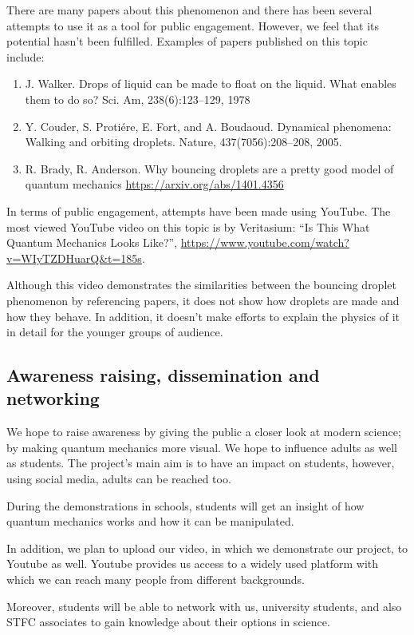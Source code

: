 There are many papers about this phenomenon and there has been several attempts to use it as a tool for public engagement. However, we feel that its potential hasn't been fulfilled. Examples of papers published on this topic include:
\begin{enumerate}
    \item J. Walker. Drops of liquid can be made to float on the liquid. What enables them to do so? Sci. Am, 238(6):123--129, 1978
    \item Y. Couder, S. Proti\'ere, E. Fort, and A. Boudaoud. Dynamical phenomena: Walking and orbiting droplets. Nature, 437(7056):208--208, 2005.
    \item R. Brady, R. Anderson. Why bouncing droplets are a pretty good model of quantum mechanics \url{https://arxiv.org/abs/1401.4356}
\end{enumerate}

In terms of public engagement, attempts have been made using YouTube. The most viewed YouTube video on this topic is by Veritasium: ``Is This What Quantum Mechanics Looks Like?'', \url{https://www.youtube.com/watch?v=WIyTZDHuarQ\&t=185s}. 

Although this video demonstrates the similarities between the bouncing droplet phenomenon by referencing papers, it does not show how droplets are made and how they behave. In addition, it doesn't make efforts to explain the physics of it in detail for the younger groups of audience. 

\subsection{Awareness raising, dissemination and networking}

We hope to raise awareness by giving the public a closer look at modern science; by making quantum mechanics more visual. We hope to influence adults as well as students. The project's main aim is to have an impact on students, however, using social media, adults can be reached too. 

During the demonstrations in schools, students will get an insight of how quantum mechanics works and how it can be manipulated. 

In addition, we plan to upload our video, in which we demonstrate our project, to Youtube as well. Youtube provides us access to a widely used platform with which we can reach many people from different backgrounds.

Moreover, students will be able to network with us, university students, and also STFC associates to gain knowledge about their options in science. 

